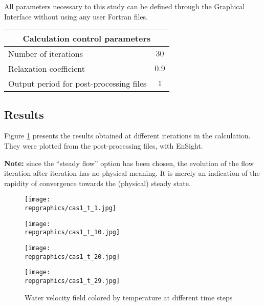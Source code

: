 All parameters necessary to this study can be defined through the Graphical
Interface without using any user Fortran files.

\begin{center}
\begin{tabular}{|l|c|}
\hline
\multicolumn{2}{|c|}{Calculation control parameters} \\
\hline
Number of iterations & $30$ \\
\hline
Relaxation coefficient & $0.9$ \\
\hline
Output period for post-processing files& $1$ \\
\hline
\end{tabular}
\end{center}



        \subsection{Results}

Figure \ref{fige1_e1} presents the results obtained at different iterations in the
calculation. They were plotted from the post-processing files, with EnSight.

\textbf{Note:} since the ``steady flow'' option has been chosen, the evolution
of the flow iteration after iteration has no physical meaning. It is merely an
indication of the rapidity of convergence towards the (physical) steady state.

\begin{figure}[h]
\parbox{0.5\textwidth}{%
\texttt{[image: \\repgraphics/cas1\_t\_1.jpg]}}
\parbox{0.5\textwidth}{%
\texttt{[image: \\repgraphics/cas1\_t\_10.jpg]}}
\vspace*{0.5cm}
\parbox{0.5\textwidth}{%
\texttt{[image: \\repgraphics/cas1\_t\_20.jpg]}}
\parbox{0.5\textwidth}{%
\texttt{[image: \\repgraphics/cas1\_t\_29.jpg]}}
\caption{\label{fige1_e1}Water velocity field colored by temperature at different time steps}
\end{figure}


